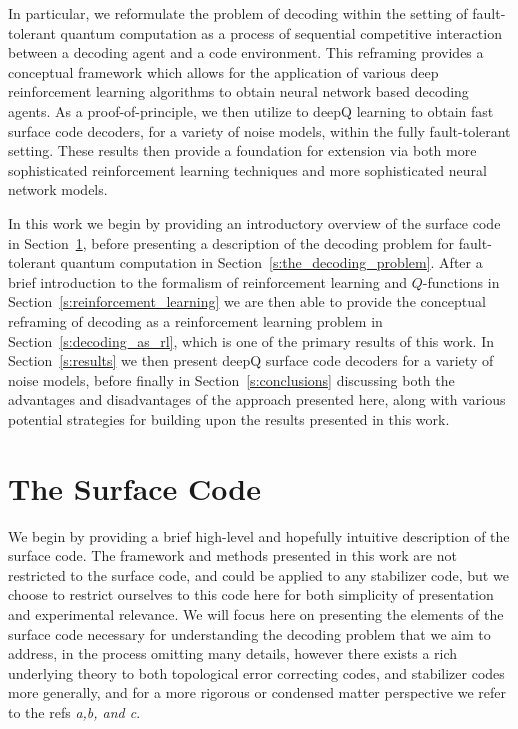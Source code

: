 \documentclass[onecolumn,preprintnumbers,amsmath,amssymb,notitlepage,nofootinbib,longbibliography,superscriptaddress,aps,pra,10pt]{revtex4-1}
\begin{document}
	In particular, we reformulate the problem of decoding within the setting of fault-tolerant quantum computation as a process of sequential competitive interaction between a decoding agent and a code environment.
	This reframing provides a conceptual framework which allows for the application of various deep reinforcement learning algorithms to obtain neural network based decoding agents.
	As a proof-of-principle, we then utilize to deepQ learning to obtain fast surface code decoders, for a variety of noise models, within the fully fault-tolerant setting.
	These results then provide a foundation for extension via both more sophisticated reinforcement learning techniques and more sophisticated neural network models.

	In this work we begin by providing an introductory overview of the surface code in Section~\ref{s:the_surface_code}, before presenting a description of the decoding problem for fault-tolerant quantum computation in Section~\ref{s:the_decoding_problem}.
	After a brief introduction to the formalism of reinforcement learning and $Q$-functions in Section~\ref{s:reinforcement_learning} we are then able to provide the conceptual reframing of decoding as a reinforcement learning problem in Section~\ref{s:decoding_as_rl}, which is one of the primary results of this work.
	In Section~\ref{s:results} we then present deepQ surface code decoders for a variety of noise models, before finally in Section~\ref{s:conclusions} discussing both the advantages and disadvantages of the approach presented here, along with various potential strategies for building upon the results presented in this work.

\section{The Surface Code}\label{s:the_surface_code}

	    We begin by providing a brief high-level and hopefully intuitive description of the surface code. The framework and methods presented in this work are not restricted to the surface code, and could be applied to any stabilizer code, but we choose to restrict ourselves to this code here for both simplicity of presentation and experimental relevance. We will focus here on presenting the elements of the surface code necessary for understanding the decoding problem that we aim to address, in the process omitting many details, however there exists a rich underlying theory to both topological error correcting codes, and stabilizer codes more generally, and for a more rigorous or condensed matter perspective we refer to the refs \textit{a,b, and c}.
\end{document}
